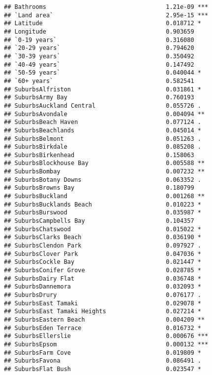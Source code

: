 \documentclass[
]{article}
\begin{document}
\begin{verbatim}
## Bathrooms                                  1.21e-09 ***
## `Land area`                                2.95e-15 ***
## Latitude                                   0.018712 *  
## Longitude                                  0.903659    
## `0-19 years`                               0.316080    
## `20-29 years`                              0.794620    
## `30-39 years`                              0.350492    
## `40-49 years`                              0.147492    
## `50-59 years`                              0.040044 *  
## `60+ years`                                0.582541    
## SuburbsAlfriston                           0.031861 *  
## SuburbsArmy Bay                            0.760193    
## SuburbsAuckland Central                    0.055726 .  
## SuburbsAvondale                            0.004094 ** 
## SuburbsBeach Haven                         0.077124 .  
## SuburbsBeachlands                          0.045014 *  
## SuburbsBelmont                             0.051263 .  
## SuburbsBirkdale                            0.085208 .  
## SuburbsBirkenhead                          0.158063    
## SuburbsBlockhouse Bay                      0.005588 ** 
## SuburbsBombay                              0.007232 ** 
## SuburbsBotany Downs                        0.063352 .  
## SuburbsBrowns Bay                          0.180799    
## SuburbsBuckland                            0.001268 ** 
## SuburbsBucklands Beach                     0.010223 *  
## SuburbsBurswood                            0.035987 *  
## SuburbsCampbells Bay                       0.104357    
## SuburbsChatswood                           0.015022 *  
## SuburbsClarks Beach                        0.036190 *  
## SuburbsClendon Park                        0.097927 .  
## SuburbsClover Park                         0.047036 *  
## SuburbsCockle Bay                          0.021447 *  
## SuburbsConifer Grove                       0.028785 *  
## SuburbsDairy Flat                          0.036748 *  
## SuburbsDannemora                           0.032093 *  
## SuburbsDrury                               0.076177 .  
## SuburbsEast Tamaki                         0.029078 *  
## SuburbsEast Tamaki Heights                 0.027214 *  
## SuburbsEastern Beach                       0.004209 ** 
## SuburbsEden Terrace                        0.016732 *  
## SuburbsEllerslie                           0.000676 ***
## SuburbsEpsom                               0.000132 ***
## SuburbsFarm Cove                           0.019809 *  
## SuburbsFavona                              0.086491 .  
## SuburbsFlat Bush                           0.023547 *  

\end{verbatim}
\end{document}
